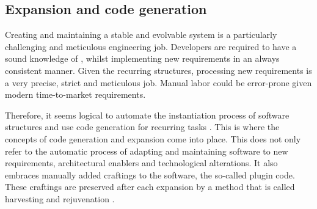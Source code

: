 \subsection{Expansion and code generation} \label{subsec_expansion}

Creating and maintaining a stable and evolvable system is a particularly challenging and
meticulous engineering job. Developers are required to have a sound knowledge of \ns,
whilst implementing new requirements in an always consistent manner. Given the recurring
structures, processing new requirements is a very precise, strict and meticulous job.
\parencite[403]{mannaert_normalized_2016} Manual labor could be error-prone given modern
time-to-market requirements. 

Therefore, it seems logical to automate the instantiation process of software structures
and use code generation for recurring tasks \parencite[403]{mannaert_normalized_2016}.
This is where the concepts of code generation and expansion come into place. This does not
only refer to the automatic process of adapting and maintaining software to new
requirements, architectural enablers and technological alterations. It also embraces
manually added craftings to the software, the so-called plugin code. These craftings are
preserved after each expansion by a method that is called harvesting and rejuvenation
\parencite[405-406]{mannaert_normalized_2016}.

